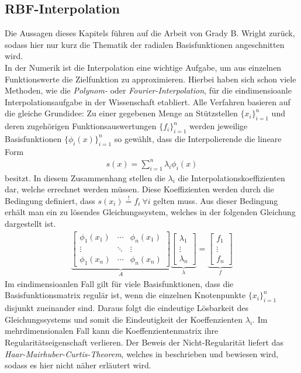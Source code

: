 \documentclass[a4paper,11pt]{article}
\begin{document}
\subsection{RBF-Interpolation}
Die Aussagen dieses Kapitels führen auf die Arbeit von Grady B. Wright \cite{wright2003radial} zurück, sodass  hier nur kurz die Thematik der radialen Basisfunktionen angeschnitten wird.\\
In der Numerik ist die Interpolation eine wichtige Aufgabe, um aus einzelnen Funktionswerte die Zielfunktion zu approximieren. Hierbei haben sich schon viele Methoden, wie die \textit{Polynom-} oder \textit{Fourier-Interpolation}, für die eindimensioanle Interpolationsaufgabe in der Wissenschaft etabliert. Alle Verfahren basieren auf die gleiche Grundidee: Zu einer gegebenen Menge an Stützstellen $\{x_i\}_{i=1}^n$ und deren zugehörigen Funktionsauswertungen $\{f_i\}_{i=1}^n$ werden jeweilige Basisfunktionen $\{\phi_i(x)\}_{i=1}^n$ so gewählt, dass die Interpolierende die lineare Form
\begin{align}
 s(x)=\sum_{i=1}^n\lambda_i\phi_i(x)
\end{align}
besitzt. In diesem Zusammenhang stellen die $\lambda_i$ die Interpolationskoeffizienten dar, welche errechnet werden müssen. Diese Koeffizienten werden durch die Bedingung definiert, dass $s(x_i)\overset{!}{=}f_i~\forall i$ gelten muss. Aus dieser Bedingung erhält man ein zu lösendes Gleichungssystem, welches in der folgenden Gleichung dargestellt ist.
\begin{align}
\underbrace{\begin{bmatrix}
 \phi_1(x_1) & \cdots & \phi_n(x_1) \\ \vdots & \ddots & \vdots \\ \phi_1(x_n) & \cdots & \phi_n(x_n)
\end{bmatrix}}_{A}
\underbrace{\begin{bmatrix}
 \lambda_1 \\ \vdots \\ \lambda_n
\end{bmatrix}}_{\lambda}
=
\underbrace{\begin{bmatrix}
 f_1 \\ \vdots \\ f_n
\end{bmatrix}}_{f}\label{eq:Intermatrix}
\end{align}
Im eindimensioanlen Fall gilt für viele Basisfunktionen, dass die Basisfunktionsmatrix regulär ist, wenn die einzelnen Knotenpunkte $\{x_i\}_{i=1}^n$ disjunkt zueinander sind. Daraus folgt die eindeutige Lösbarkeit des Gleichungssystems und somit die Eindeutigkeit der Koeffenzienten $\lambda_i$. Im mehrdimensionalen Fall kann die Koeffenzientenmatrix ihre Regularitätseigenschaft verlieren. Der Beweis der Nicht-Regularität liefert das \textit{Haar-Mairhuber-Curtis-Theorem}, welches in \cite{de2013four} beschrieben und bewiesen wird, sodass es hier nicht näher erläutert wird.\\
\end{document}
